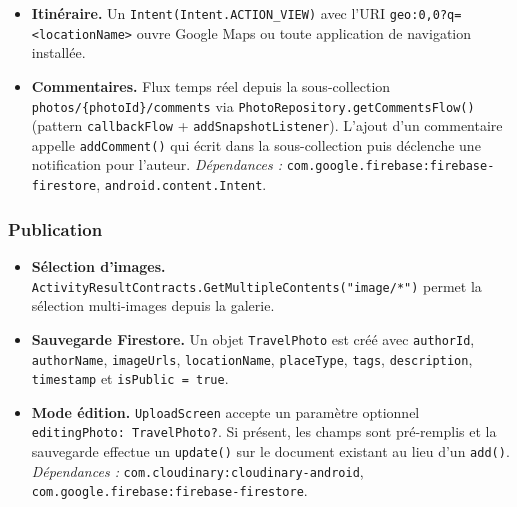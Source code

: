 \documentclass[a4paper, 12pt]{article}
\begin{document}
\begin{justify}
\begin{itemize}
    \item \textbf{Itinéraire.}
    Un \texttt{Intent(Intent.\allowbreak{}ACTION\_VIEW)} avec l'URI \texttt{geo:\allowbreak{}0,0?q=<locationName>} ouvre Google Maps ou toute application de navigation installée.

    \item \textbf{Commentaires.}
    Flux temps réel depuis la sous-collection \texttt{photos/\allowbreak{}\{photoId\}/\allowbreak{}comments} via \texttt{PhotoRepository.\allowbreak{}getCommentsFlow()} (pattern \texttt{callbackFlow} + \texttt{addSnapshotListener}). L'ajout d'un commentaire appelle \texttt{addComment()} qui écrit dans la sous-collection puis déclenche une notification pour l'auteur.
    \newline\textit{Dépendances :} \texttt{com.\allowbreak{}google.\allowbreak{}firebase:\allowbreak{}firebase-firestore}, \texttt{android.\allowbreak{}content.\allowbreak{}Intent}.

\end{itemize}

\subsubsection*{Publication}

\begin{itemize}

    \item \textbf{Sélection d'images.}
    \texttt{ActivityResultContracts.\allowbreak{}GetMultipleContents("image/\allowbreak{}*")} permet la sélection multi-images depuis la galerie.

    \item \textbf{Sauvegarde Firestore.}
    Un objet \texttt{TravelPhoto} est créé avec \texttt{authorId}, \texttt{authorName}, \texttt{imageUrls}, \texttt{locationName}, \texttt{placeType}, \texttt{tags}, \texttt{description}, \texttt{timestamp} et \texttt{isPublic = true}.

    \item \textbf{Mode édition.}
    \texttt{UploadScreen} accepte un paramètre optionnel \texttt{editingPhoto:\allowbreak{} TravelPhoto?}. Si présent, les champs sont pré-remplis et la sauvegarde effectue un \texttt{update()} sur le document existant au lieu d'un \texttt{add()}.
    \newline\textit{Dépendances :} \texttt{com.\allowbreak{}cloudinary:\allowbreak{}cloudinary-android}, \texttt{com.\allowbreak{}google.\allowbreak{}firebase:\allowbreak{}firebase-firestore}.


\end{itemize}
\end{justify}
\end{document}
